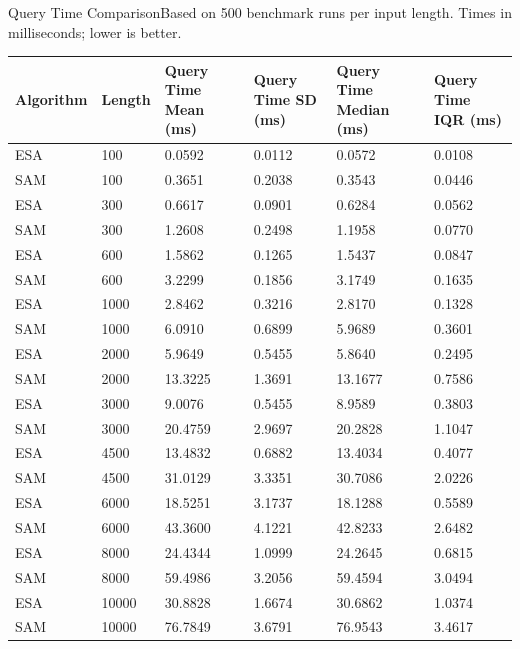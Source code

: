 \begin{benchmarktable}{Query Time Comparison}{Based on 500 benchmark runs per input length. Times in milliseconds; lower is better.}
\begin{tabularx}{\textwidth}{|X|X|X|X|X|X|}
\toprule
Algorithm & Length & Query Time Mean (ms) & Query Time SD (ms) & Query Time Median (ms) & Query Time IQR (ms) \\
\midrule
ESA & 100 & 0.0592 & 0.0112 & 0.0572 & 0.0108 \\
SAM & 100 & 0.3651 & 0.2038 & 0.3543 & 0.0446 \\
\hline
ESA & 300 & 0.6617 & 0.0901 & 0.6284 & 0.0562 \\
SAM & 300 & 1.2608 & 0.2498 & 1.1958 & 0.0770 \\
\hline
ESA & 600 & 1.5862 & 0.1265 & 1.5437 & 0.0847 \\
SAM & 600 & 3.2299 & 0.1856 & 3.1749 & 0.1635 \\
\hline
ESA & 1000 & 2.8462 & 0.3216 & 2.8170 & 0.1328 \\
SAM & 1000 & 6.0910 & 0.6899 & 5.9689 & 0.3601 \\
\hline
ESA & 2000 & 5.9649 & 0.5455 & 5.8640 & 0.2495 \\
SAM & 2000 & 13.3225 & 1.3691 & 13.1677 & 0.7586 \\
\hline
ESA & 3000 & 9.0076 & 0.5455 & 8.9589 & 0.3803 \\
SAM & 3000 & 20.4759 & 2.9697 & 20.2828 & 1.1047 \\
\hline
ESA & 4500 & 13.4832 & 0.6882 & 13.4034 & 0.4077 \\
SAM & 4500 & 31.0129 & 3.3351 & 30.7086 & 2.0226 \\
\hline
ESA & 6000 & 18.5251 & 3.1737 & 18.1288 & 0.5589 \\
SAM & 6000 & 43.3600 & 4.1221 & 42.8233 & 2.6482 \\
\hline
ESA & 8000 & 24.4344 & 1.0999 & 24.2645 & 0.6815 \\
SAM & 8000 & 59.4986 & 3.2056 & 59.4594 & 3.0494 \\
\hline
ESA & 10000 & 30.8828 & 1.6674 & 30.6862 & 1.0374 \\
SAM & 10000 & 76.7849 & 3.6791 & 76.9543 & 3.4617 \\
\bottomrule
\end{tabularx}
\end{benchmarktable}


